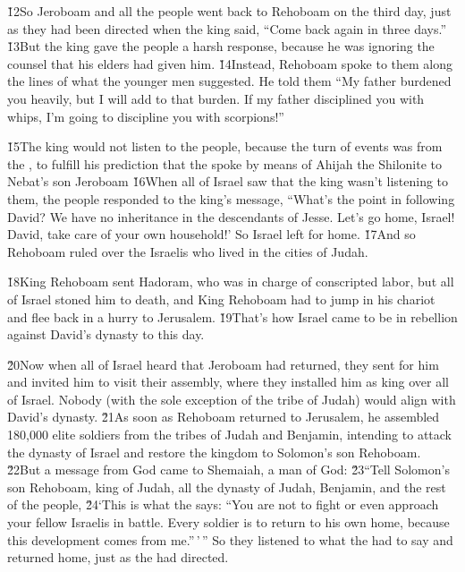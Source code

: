 \v{12}So Jeroboam and all the people went back to Rehoboam on the third day, just as they had been directed when the king said, ``Come back again in three days.'' \v{13}But the king gave the people a harsh response, because he was ignoring the counsel that his elders had given him. \v{14}Instead, Rehoboam spoke to them along the lines of what the younger men suggested. He told them ``My father burdened you heavily, but I will add to that burden. If my father disciplined you with whips, I'm going to discipline you with scorpions!''

\v{15}The king would not listen to the people, because the turn of events was from the , to fulfill his prediction that the  spoke by means of Ahijah the Shilonite to Nebat's son Jeroboam \v{16}When all of Israel saw that the king wasn't listening to them, the people responded to the king's message, ``What's the point in following David? We have no inheritance in the descendants of Jesse. Let's go home, Israel! David, take care of your own household!' So Israel left for home. \v{17}And so Rehoboam ruled over the Israelis who lived in the cities of Judah.

\v{18}King Rehoboam sent Hadoram, who was in charge of conscripted labor, but all of Israel stoned him to death, and King Rehoboam had to jump in his chariot and flee back in a hurry to Jerusalem. \v{19}That's how Israel came to be in rebellion against David's dynasty to this day.

\v{20}Now when all of Israel heard that Jeroboam had returned, they sent for him and invited him to visit their assembly, where they installed him as king over all of Israel. Nobody (with the sole exception of the tribe of Judah) would align with David's dynasty. \v{21}As soon as Rehoboam returned to Jerusalem, he assembled 180,000 elite soldiers from the tribes of Judah and Benjamin, intending to attack the dynasty of Israel and restore the kingdom to Solomon's son Rehoboam. \v{22}But a message from God came to Shemaiah, a man of God: \v{23}``Tell Solomon's son Rehoboam, king of Judah, all the dynasty of Judah, Benjamin, and the rest of the people, \v{24}`This is what the  says: ``You are not to fight or even approach your fellow Israelis in battle. Every soldier is to return to his own home, because this development comes from me.''\,'\,'' So they listened to what the  had to say and returned home, just as the  had directed.

